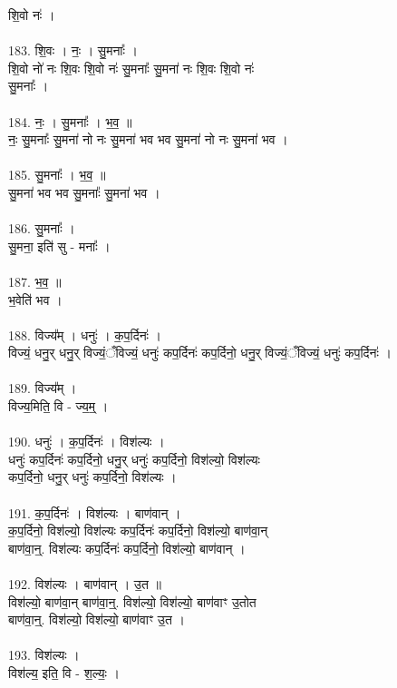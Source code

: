 शि॒वो नः॑ ।\\
\\
183. शि॒वः । नः॒ । सु॒मनाः᳚ ।\\
शि॒वो नो॑ नः शि॒वः शि॒वो नः॑ सु॒मनाः᳚ सु॒मना॑ नः शि॒वः शि॒वो नः॑\\
सु॒मनाः᳚ ।\\
\\
184. नः॒ । सु॒मनाः᳚ । भ॒व॒ ॥\\
नः॒ सु॒मनाः᳚ सु॒मना॑ नो नः सु॒मना॑ भव भव सु॒मना॑ नो नः सु॒मना॑ भव ।\\
\\
185. सु॒मनाः᳚ । भ॒व॒ ॥\\
सु॒मना॑ भव भव सु॒मनाः᳚ सु॒मना॑ भव ।\\
\\
186. सु॒मनाः᳚ ।\\
सु॒मना॒ इति॑ सु - मनाः᳚ ।\\
\\
187. भ॒व॒ ॥\\
भ॒वेति॑ भव ।\\
\\
188. विज्य᳚म् । धनुः॑ । क॒प॒र्दिनः॑ ।\\
विज्यं॒ धनु॒र् धनु॒र् विज्यं॒ँविज्यं॒ धनुः॑ कप॒र्दिनः॑ कप॒र्दिनो॒ धनु॒र् विज्यं॒ँविज्यं॒ धनुः॑ कप॒र्दिनः॑ ।\\
\\
189. विज्य᳚म् ।\\
विज्य॒मिति॒ वि - ज्य॒म्॒ ।\\
\\
190. धनुः॑ । क॒प॒र्दिनः॑ । विश॑ल्यः ।\\
धनुः॑ कप॒र्दिनः॑ कप॒र्दिनो॒ धनु॒र् धनुः॑ कप॒र्दिनो॒ विश॑ल्यो॒ विश॑ल्यः\\
कप॒र्दिनो॒ धनु॒र् धनुः॑ कप॒र्दिनो॒ विश॑ल्यः ।\\
\\
191. क॒प॒र्दिनः॑ । विश॑ल्यः । बाण॑वान् ।\\
क॒प॒र्दिनो॒ विश॑ल्यो॒ विश॑ल्यः कप॒र्दिनः॑ कप॒र्दिनो॒ विश॑ल्यो॒ बाण॑वा॒न्\\
बाण॑वा॒न्॒. विश॑ल्यः कप॒र्दिनः॑ कप॒र्दिनो॒ विश॑ल्यो॒ बाण॑वान् ।\\
\\
192. विश॑ल्यः । बाण॑वान् । उ॒त ॥\\
विश॑ल्यो॒ बाण॑वा॒न् बाण॑वा॒न्॒. विश॑ल्यो॒ विश॑ल्यो॒ बाण॑वाꣳ उ॒तोत\\
बाण॑वा॒न्॒. विश॑ल्यो॒ विश॑ल्यो॒ बाण॑वाꣳ उ॒त ।\\
\\
193. विश॑ल्यः ।\\
विश॑ल्य॒ इति॒ वि - श॒ल्यः॒ ।\\
